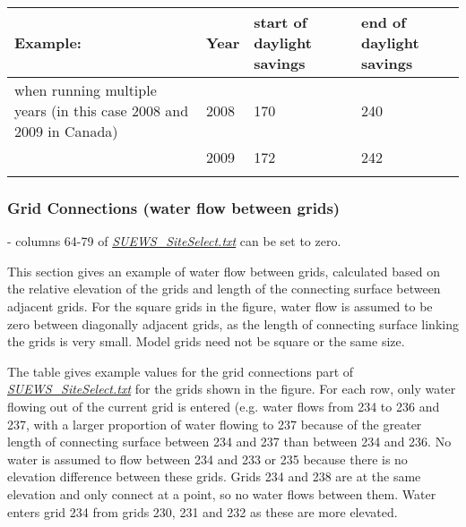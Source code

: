 \documentclass[letterpaper,10pt,english]{sphinxmanual}
\begin{document}
\begin{savenotes}\sphinxattablestart
\centering
\begin{tabulary}{\linewidth}[t]{|T|T|T|T|}
\hline
\sphinxstyletheadfamily 
Example:
&\sphinxstyletheadfamily 
Year
&\sphinxstyletheadfamily 
start of
daylight
savings
&\sphinxstyletheadfamily 
end of daylight
savings
\\
\hline
when running
multiple years
(in this case
2008 and 2009
in Canada)
&
2008
&
170
&
240
\\
\hline&
2009
&
172
&
242
\\
\hline&&&\\
\hline
\end{tabulary}
\par
\sphinxattableend\end{savenotes}


\subsubsection{Grid Connections (water flow between grids)}
\label{\detokenize{input_files/SUEWS_SiteInfo/SUEWS_SiteSelect:grid-connections-water-flow-between-grids}}
 - columns 64-79 of
{\hyperref[\detokenize{input_files/SUEWS_SiteInfo/SUEWS_SiteSelect:SUEWS_SiteSelect.txt}]{\emph{SUEWS\_SiteSelect.txt}}} can be set to zero.

This section gives an example of water flow between grids, calculated
based on the relative elevation of the grids and length of the
connecting surface between adjacent grids. For the square grids in the
figure, water flow is assumed to be zero between diagonally adjacent
grids, as the length of connecting surface linking the grids is very
small. Model grids need not be square or the same size.

The table gives example values for the grid connections part of
{\hyperref[\detokenize{input_files/SUEWS_SiteInfo/SUEWS_SiteSelect:SUEWS_SiteSelect.txt}]{\emph{SUEWS\_SiteSelect.txt}}} for the grids shown in
the figure. For each row, only water flowing out of the current grid is
entered (e.g. water flows from 234 to 236 and 237, with a larger
proportion of water flowing to 237 because of the greater length of
connecting surface between 234 and 237 than between 234 and 236. No
water is assumed to flow between 234 and 233 or 235 because there is no
elevation difference between these grids. Grids 234 and 238 are at the
same elevation and only connect at a point, so no water flows between
them. Water enters grid 234 from grids 230, 231 and 232 as these are
more elevated.
\end{document}
